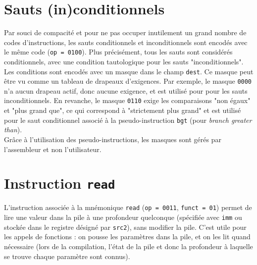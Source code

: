 \section{Sauts (in)conditionnels}

Par souci de compacité et pour ne pas occuper inutilement un grand nombre de
codes d'instructions, les sauts conditionnels et inconditionnels sont encodés
avec le même code (\texttt{op = 0100}). Plus précisément, tous les sauts sont
considérés conditionnels, avec une condition tautologique pour les sauts
"inconditionnels". \\

Les conditions sont encodés avec un masque\cite{bit_mask} dans le champ
\texttt{dest}. Ce masque peut être vu comme un tableau de drapeaux d'exigences.
Par exemple, le masque \texttt{0000} n'a aucun drapeau actif, donc aucune
exigence, et est utilisé pour pour les sauts inconditionnels. En revanche, le
masque \texttt{0110} exige les comparaisons "non égaux" et "plus grand que", ce
qui correspond à "strictement plus grand" et est utilisé pour le saut
conditionnel associé à la pseudo-instruction \texttt{bgt} (pour \textit{branch
greater than}). \\

Grâce à l'utilisation des pseudo-instructions, les masques sont gérés par
l'assembleur et non l'utilisateur.

\section{Instruction \texttt{read}}

L'instruction associée à la mnémonique \texttt{read} (\texttt{op = 0011},
\texttt{funct = 01}) permet de lire une valeur dans la pile à une profondeur
quelconque (spécifiée avec \texttt{imm} ou stockée dans le registre désigné par
\texttt{src2}), sans modifier la pile. C'est utile pour les appels de
fonctions : on pousse les paramètres dans la pile, et on les lit quand
nécessaire (lors de la compilation, l'état de la pile et donc la
profondeur à laquelle se trouve chaque paramètre sont connus).
